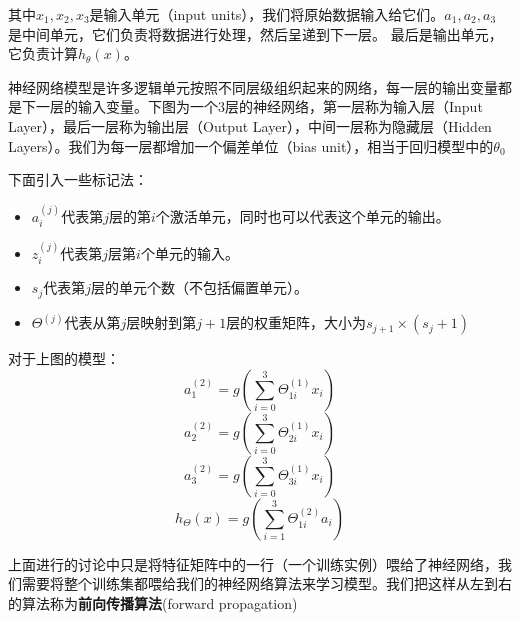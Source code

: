 \documentclass[cn,hazy,blue,normal,14pt]{elegantnote}
\begin{document}
其中$x_1,x_2,x_3$是输入单元（input units），我们将原始数据输入给它们。$a_1,a_2,a_3$ 是中间单元，它们负责将数据进行处理，然后呈递到下一层。 最后是输出单元，它负责计算$h_\theta(x)$。

神经网络模型是许多逻辑单元按照不同层级组织起来的网络，每一层的输出变量都是下一层的输入变量。下图为一个3层的神经网络，第一层称为输入层（Input Layer），最后一层称为输出层（Output Layer），中间一层称为隐藏层（Hidden Layers）。我们为每一层都增加一个偏差单位（bias unit），相当于回归模型中的$\theta_0$

下面引入一些标记法：
\begin{itemize}
    \item $a_i^{(j)}$代表第$j$层的第$i$个激活单元，同时也可以代表这个单元的输出。
    \item $z_i^{(j)}$代表第$j$层第$i$个单元的输入。
    \item $s_j$代表第$j$层的单元个数（不包括偏置单元）。
    \item $\Theta^{(j)}$代表从第$j$层映射到第$j+1$层的权重矩阵，大小为$s_{j+1}\times (s_j+1)$
\end{itemize}

对于上图的模型：
$$
a_1 ^{(2)}=g(\sum_{i=0}^{3}\Theta_{1i}^{(1)}x_i) 
$$
$$
a_2 ^{(2)}=g(\sum_{i=0}^{3}\Theta_{2i}^{(1)}x_i)
$$
$$
a_3 ^{(2)}=g(\sum_{i=0}^{3}\Theta_{3i}^{(1)}x_i)
$$
$$
h_\Theta(x)=g(\sum_{i=1}^{3}\Theta_{1i}^{(2)}a_i)
$$

上面进行的讨论中只是将特征矩阵中的一行（一个训练实例）喂给了神经网络，我们需要将整个训练集都喂给我们的神经网络算法来学习模型。我们把这样从左到右的算法称为\textbf{前向传播算法}(forward propagation)
\end{document}
